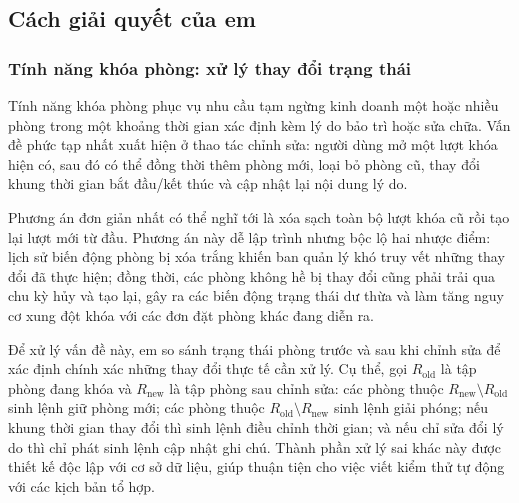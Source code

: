 \subsection{Cách giải quyết của em}

\subsubsection{Tính năng khóa phòng: xử lý thay đổi trạng thái}

Tính năng khóa phòng phục vụ nhu cầu tạm ngừng kinh doanh một hoặc nhiều phòng trong một khoảng thời gian xác định kèm lý do bảo trì hoặc sửa chữa. Vấn đề phức tạp nhất xuất hiện ở thao tác chỉnh sửa: người dùng mở một lượt khóa hiện có, sau đó có thể đồng thời thêm phòng mới, loại bỏ phòng cũ, thay đổi khung thời gian bắt đầu/kết thúc và cập nhật lại nội dung lý do.

Phương án đơn giản nhất có thể nghĩ tới là xóa sạch toàn bộ lượt khóa cũ rồi tạo lại lượt mới từ đầu. Phương án này dễ lập trình nhưng bộc lộ hai nhược điểm: lịch sử biến động phòng bị xóa trắng khiến ban quản lý khó truy vết những thay đổi đã thực hiện; đồng thời, các phòng không hề bị thay đổi cũng phải trải qua chu kỳ hủy và tạo lại, gây ra các biến động trạng thái dư thừa và làm tăng nguy cơ xung đột khóa với các đơn đặt phòng khác đang diễn ra.

Để xử lý vấn đề này, em so sánh trạng thái phòng trước và sau khi chỉnh sửa để xác định chính xác những thay đổi thực tế cần xử lý. Cụ thể, gọi $R_{\text{old}}$ là tập phòng đang khóa và $R_{\text{new}}$ là tập phòng sau chỉnh sửa: các phòng thuộc $R_{\text{new}} \setminus R_{\text{old}}$ sinh lệnh giữ phòng mới; các phòng thuộc $R_{\text{old}} \setminus R_{\text{new}}$ sinh lệnh giải phóng; nếu khung thời gian thay đổi thì sinh lệnh điều chỉnh thời gian; và nếu chỉ sửa đổi lý do thì chỉ phát sinh lệnh cập nhật ghi chú. Thành phần xử lý sai khác này được thiết kế độc lập với cơ sở dữ liệu, giúp thuận tiện cho việc viết kiểm thử tự động với các kịch bản tổ hợp.

